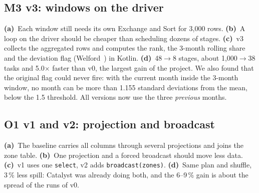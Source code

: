 \documentclass[sigconf]{acmart}
\newcommand{\pa}{\textbf{(a)}~}\newcommand{\pb}{\textbf{(b)}~}\newcommand{\pc}{\textbf{(c)}~}\newcommand{\pd}{\textbf{(d)}~}
\begin{document}
\subsection{M3 v3: windows on the driver}
\pa Each window still needs its own Exchange and Sort for 3{,}000 rows. \pb A loop on the driver should be cheaper than scheduling
dozens of stages. \pc v3 collects the aggregated rows and computes the rank, the 3-month rolling share and the deviation flag
(Welford~\cite{welford}) in Kotlin. \pd 48$\rightarrow$8 stages, about 1{,}000$\rightarrow$38 tasks and 5.0$\times$ faster than v0,
the largest gain of the project. We also found that the original flag could never fire: with the current month inside the 3-month
window, no month can be more than 1.155 standard deviations from the mean, below the 1.5 threshold. All versions now use the
three \emph{previous} months.

\subsection{O1 v1 and v2: projection and broadcast}
\pa The baseline carries all columns through several projections and joins the zone table. \pb One projection and a forced broadcast
should move less data. \pc v1 uses one \texttt{select}, v2 adds \texttt{broadcast(zones)}. \pd Same plan and shuffle, 3\,\% less spill:
Catalyst was already doing both, and the 6--9\,\% gain is about the spread of the runs of v0.
\end{document}

